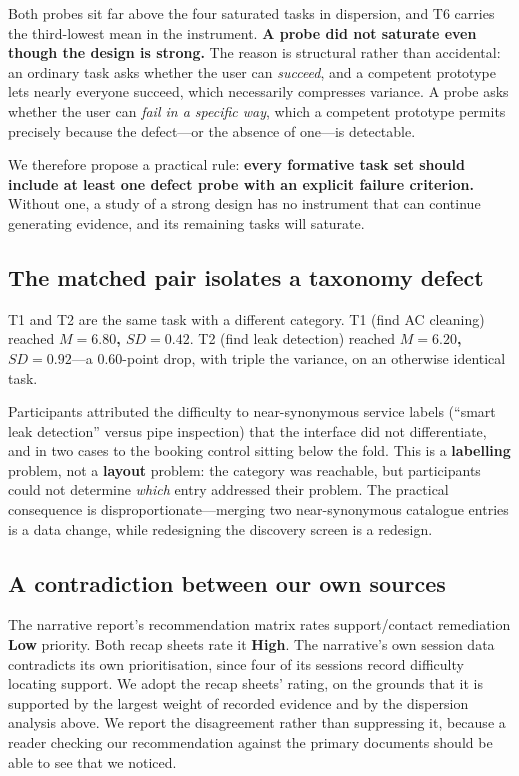 \documentclass[conference]{IEEEtran}
\begin{document}
Both probes sit far above the four saturated tasks in dispersion, and T6 carries
the third-lowest mean in the instrument. \textbf{A probe did not saturate even
though the design is strong.} The reason is structural rather than accidental:
an ordinary task asks whether the user can \emph{succeed}, and a competent
prototype lets nearly everyone succeed, which necessarily compresses variance.
A probe asks whether the user can \emph{fail in a specific way}, which a
competent prototype permits precisely because the defect---or the absence of
one---is detectable.

We therefore propose a practical rule: \textbf{every formative task set should
include at least one defect probe with an explicit failure criterion.} Without
one, a study of a strong design has no instrument that can continue generating
evidence, and its remaining tasks will saturate.

\subsection{The matched pair isolates a taxonomy defect}

T1 and T2 are the same task with a different category. T1 (find AC cleaning)
reached \textbf{$M=6.80$, $SD=0.42$}. T2 (find leak detection) reached
\textbf{$M=6.20$, $SD=0.92$}---a 0.60-point drop, with triple the variance, on
an otherwise identical task.

Participants attributed the difficulty to near-synonymous service labels
(``smart leak detection'' versus pipe inspection) that the interface did not
differentiate, and in two cases to the booking control sitting below the fold.
This is a \textbf{labelling} problem, not a \textbf{layout} problem: the
category was reachable, but participants could not determine \emph{which} entry
addressed their problem. The practical consequence is disproportionate---merging
two near-synonymous catalogue entries is a data change, while redesigning the
discovery screen is a redesign.

\subsection{A contradiction between our own sources}

The narrative report's recommendation matrix rates support/contact remediation
\textbf{Low} priority. Both recap sheets rate it \textbf{High}. The narrative's
own session data contradicts its own prioritisation, since four of its sessions
record difficulty locating support. We adopt the recap sheets' rating, on the
grounds that it is supported by the largest weight of recorded evidence and by
the dispersion analysis above. We report the disagreement rather than
suppressing it, because a reader checking our recommendation against the
primary documents should be able to see that we noticed.
\end{document}
